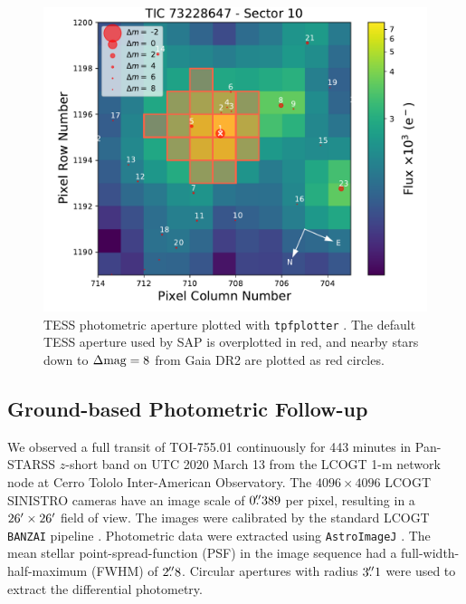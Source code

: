\documentclass[fleqn,usenatbib]{mnras}
\begin{document}
\begin{figure}
    \centering
    \includegraphics[width=\columnwidth, trim={0 0.8cm 1.8cm 0.1cm}]{TPF_Gaia_TIC73228647_S10}
    \caption{TESS photometric aperture plotted with \texttt{tpfplotter} \citep{2020A&A...635A.128A}. The default TESS aperture used by SAP is overplotted in red, and nearby stars down to $\Delta{\rm mag}=8$ from Gaia DR2 \citep{brown2018gaia} are plotted as red circles.}
    \label{fig:tpf}
\end{figure}

\subsection{Ground-based Photometric Follow-up}
We observed a full transit of TOI-755.01 continuously for 443 minutes in Pan-STARSS $z$-short band on UTC 2020 March 13 from the LCOGT \citep{Brown:2013} 1-m network node at Cerro Tololo Inter-American Observatory.
The $4096\times4096$ LCOGT SINISTRO cameras have an image scale of $0\hbox{$.\!\!^{\prime\prime}$}389$ per pixel, resulting in a $26\hbox{$^\prime$}\times26\hbox{$^\prime$}$ field of view.
The images were calibrated by the standard LCOGT {\tt BANZAI} pipeline \citep{McCully:2018}.
Photometric data were extracted using {\tt AstroImageJ} \citep{Collins:2017}.
The mean stellar point-spread-function (PSF) in the image sequence had a full-width-half-maximum (FWHM) of $2\hbox{$.\!\!^{\prime\prime}$}8$.
Circular apertures with radius $3\hbox{$.\!\!^{\prime\prime}$}1$ were used to extract the differential photometry.
\end{document}
